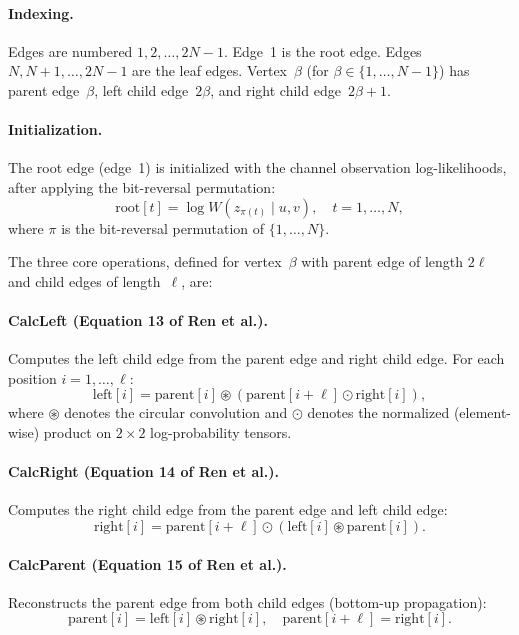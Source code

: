 \documentclass[11pt,a4paper]{article}
\newcommand{\circonv}{\circledast}
\newcommand{\normprod}{\odot}
\begin{document}
\paragraph{Indexing.} Edges are numbered $1, 2, \ldots, 2N - 1$. Edge~1 is the root edge. Edges $N, N+1, \ldots, 2N - 1$ are the leaf edges. Vertex~$\beta$ (for $\beta \in \{1, \ldots, N-1\}$) has parent edge~$\beta$, left child edge~$2\beta$, and right child edge~$2\beta + 1$.

\paragraph{Initialization.} The root edge (edge~1) is initialized with the channel observation log-likelihoods, after applying the bit-reversal permutation:
\begin{equation}
    \text{root}[t] = \log W(z_{\pi(t)} \mid u, v), \quad t = 1, \ldots, N,
\end{equation}
where $\pi$ is the bit-reversal permutation of $\{1, \ldots, N\}$.

The three core operations, defined for vertex~$\beta$ with parent edge of length $2\ell$ and child edges of length~$\ell$, are:

\paragraph{CalcLeft (Equation 13 of Ren et al.).} Computes the left child edge from the parent edge and right child edge. For each position $i = 1, \ldots, \ell$:
\begin{equation}
    \text{left}[i] = \text{parent}[i] \circonv \left(\text{parent}[i + \ell] \normprod \text{right}[i]\right),
    \label{eq:calc_left}
\end{equation}
where $\circonv$ denotes the circular convolution and $\normprod$ denotes the normalized (element-wise) product on $2 \times 2$ log-probability tensors.

\paragraph{CalcRight (Equation 14 of Ren et al.).} Computes the right child edge from the parent edge and left child edge:
\begin{equation}
    \text{right}[i] = \text{parent}[i + \ell] \normprod \left(\text{left}[i] \circonv \text{parent}[i]\right).
    \label{eq:calc_right}
\end{equation}

\paragraph{CalcParent (Equation 15 of Ren et al.).} Reconstructs the parent edge from both child edges (bottom-up propagation):
\begin{equation}
    \text{parent}[i] = \text{left}[i] \circonv \text{right}[i], \quad \text{parent}[i + \ell] = \text{right}[i].
    \label{eq:calc_parent}
\end{equation}
\end{document}
